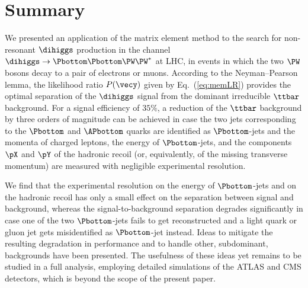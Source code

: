 \section{Summary}
\label{sec:summary}

We presented an application of the matrix element method 
to the search for non-resonant $\dihiggs$ production in the channel $\dihiggs \to \Pbottom\Pbottom\PW\PW^{*}$ at LHC,
in events in which the two $\PW$ bosons decay to a pair of electrons or muons.
According to the Neyman–Pearson lemma,
the likelihood ratio $P(\vecy)$ given by Eq.~(\ref{eq:memLR}) provides the optimal separation of the $\dihiggs$ signal from the dominant irreducible $\ttbar$ background.
For a signal efficiency of $35\%$,
a reduction of the $\ttbar$ background by three orders of magnitude can be achieved in case the two jets corresponding to the $\Pbottom$ and $\APbottom$ quarks are identified as $\Pbottom$-jets
and the momenta of charged leptons, the energy of $\Pbottom$-jets, and the components $\pX$ and $\pY$ of the hadronic recoil (or, equivalently, of the missing transverse momentum)
are measured with negligible experimental resolution.

We find that the experimental resolution on the energy of $\Pbottom$-jets and on the hadronic recoil has only a small effect on the separation between signal and background,
whereas the signal-to-background separation degrades significantly in case one of the two $\Pbottom$-jets
fails to get reconstructed and a light quark or gluon jet gets misidentified as $\Pbottom$-jet instead.
Ideas to mitigate the resulting degradation in performance and to handle other, subdominant, backgrounds have been presented.
The usefulness of these ideas yet remains to be studied in a full analysis, employing detailed simulations of the ATLAS and CMS detectors, which is beyond the scope of the present paper.
